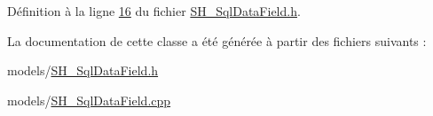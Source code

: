 Définition à la ligne \hyperlink{SH__SqlDataField_8h_source_l00016}{16} du fichier \hyperlink{SH__SqlDataField_8h_source}{S\-H\-\_\-\-Sql\-Data\-Field.\-h}.



La documentation de cette classe a été générée à partir des fichiers suivants \-:\begin{DoxyCompactItemize}
\item 
models/\hyperlink{SH__SqlDataField_8h}{S\-H\-\_\-\-Sql\-Data\-Field.\-h}\item 
models/\hyperlink{SH__SqlDataField_8cpp}{S\-H\-\_\-\-Sql\-Data\-Field.\-cpp}\end{DoxyCompactItemize}
